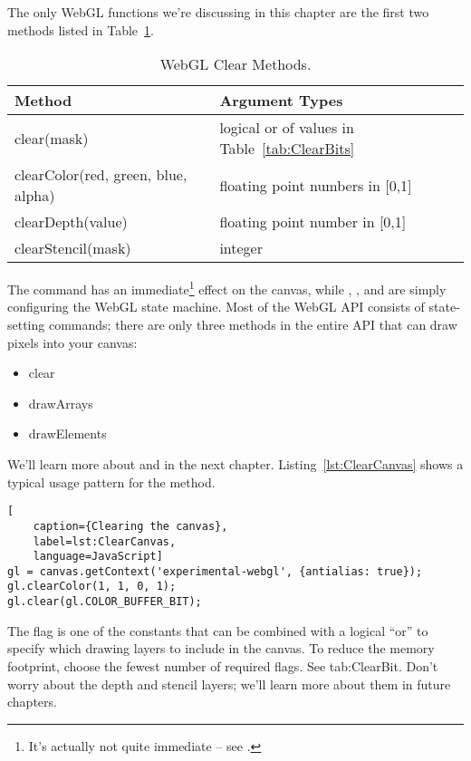 The only WebGL functions we're discussing in this chapter are the first two methods listed in Table~\ref{tab:Clearing}.

\begin{table}[htb]\centering
  \begin{tabular}{ll}
    \hline
    Method & Argument Types \\
    \hline
    clear(mask) & logical or of values in Table~\ref{tab:ClearBits} \\
    clearColor(red, green, blue, alpha)  & floating point numbers in [0,1] \\
    clearDepth(value) & floating point number in [0,1] \\
    clearStencil(mask) & integer \\
    \hline
  \end{tabular}
  \caption{WebGL Clear Methods.}
  \label{tab:Clearing}
\end{table}

The  command has an immediate\footnote{It's actually not quite immediate -- see \label{sec:doublebuffer}.} effect on the canvas, while , , and  are simply configuring the WebGL state machine.  Most of the WebGL API consists of state-setting commands; there are only three methods in the entire API that can draw pixels into your canvas:

\begin{itemize}
\item clear
\item drawArrays
\item drawElements
\end{itemize}

We'll learn more about  and  in the next chapter.  Listing~\ref{lst:ClearCanvas} shows a typical usage pattern for the  method.

\begin{lstlisting}[
    caption={Clearing the canvas},
    label=lst:ClearCanvas,
    language=JavaScript]
gl = canvas.getContext('experimental-webgl', {antialias: true});
gl.clearColor(1, 1, 0, 1);
gl.clear(gl.COLOR_BUFFER_BIT);
\end{lstlisting}

The  flag is one of the constants that can be combined with a logical ``or'' to specify which drawing layers to include in the canvas.  To reduce the memory footprint, choose the fewest number of required flags.  See tab:ClearBit.  Don't worry about the depth and stencil layers; we'll learn more about them in future chapters.

